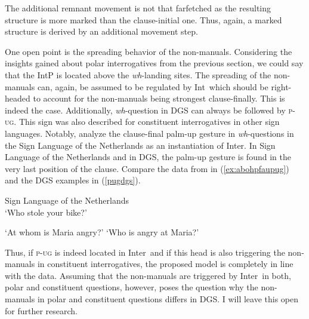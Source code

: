 \noindent The additional remnant movement is not that farfetched as the resulting structure is more marked than the clause-initial one. Thus, again, a marked structure is derived by an additional movement step.

One open point is the spreading behavior of the non-manuals. Considering the insights gained about polar interrogatives from the previous section, we could say that the IntP is located above the \textit{wh}-landing sites. The spreading of the non-manuals can, again, be assumed to be regulated by Int\textdegree\ which should be right-headed to account for the non-manuals being strongest clause-finally. This is indeed the case. Additionally, \textit{wh}-question in DGS can always be followed by \textsc{p-ug}. This sign was also described for constituent interrogatives in other sign languages. Notably, \citet{aboh2010sa} analyze the clause-final palm-up gesture in \textit{wh}-questions in the Sign Language of the Netherlands as an instantiation of Inter\textdegree . In Sign Language of the Netherlands and in DGS, the palm-up gesture is found in the very last position of the clause. Compare the data from \citet[111]{aboh2010sa} in (\ref{ex:abohpfaupug}) and the DGS examples in (\ref{pugdgs}).

\begin{exe}
\ex Sign Language of the Netherlands \citep[111]{aboh2010sa} \\ 
\glt `Who stole your bike?' \label{ex:abohpfaupug} 
\end{exe}

\begin{exe}
\ex\label{pugdgs}
\begin{xlist} 
\ex {}
\glt `At whom is Maria angry?' \label{ex:pugdgsa} 
\ex {}
\glt `Who is angry at Maria?' \label{ex:pugdgsb} 
\end{xlist}
\end{exe}

\noindent Thus, if \textsc{p-ug} is indeed located in Inter\textdegree\ and if this head is also triggering the non-manuals in constituent interrogatives, the proposed model is completely in line with the data. Assuming that the non-manuals are triggered by Inter\textdegree\ in both, polar and constituent questions, however, poses the question why the non-manuals in polar and constituent questions differs in DGS. I will leave this open for further research.   %

